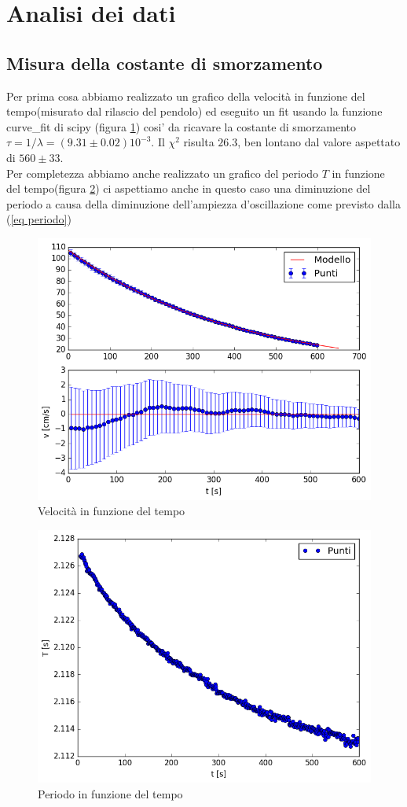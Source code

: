 \documentclass{article}
\begin{document}
	\section{Analisi dei dati}
		\subsection{Misura della costante di smorzamento}
			Per prima cosa abbiamo realizzato un grafico della velocit\`{a} in funzione del tempo(misurato dal rilascio del pendolo) ed eseguito un fit usando la funzione curve\_fit di scipy (figura \ref{fig oscillazione smorzata}) cosi' da ricavare la costante di smorzamento $\tau = 1/\lambda = (9.31\pm0.02)10^{-3}$. Il $\chi^2$ risulta $26.3$, ben lontano dal valore aspettato di $560\pm33$.\\Per completezza abbiamo anche realizzato un grafico del periodo $T$ in funzione del tempo(figura \ref{fig periodo smorzato}) ci aspettiamo anche in questo caso una diminuzione del periodo a causa della diminuzione dell'ampiezza d'oscillazione come previsto dalla (\ref{eq periodo})
			\begin{figure}
				\centering
				\includegraphics[width=0.7\linewidth]{"Oscillazione smorzata"}
				\caption{Velocit\`{a} in funzione del tempo}
				\label{fig oscillazione smorzata}
			\end{figure}
			\begin{figure}
				\centering
				\includegraphics[width=0.7\linewidth]{"Periodo smorzato"}
				\caption{Periodo in funzione del tempo}
				\label{fig periodo smorzato}
			\end{figure}
		
\end{document}
